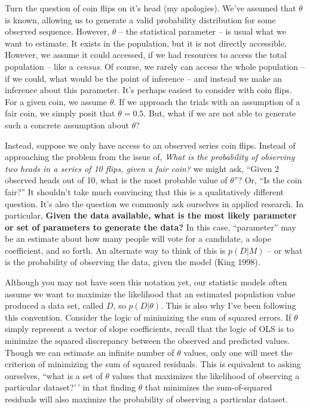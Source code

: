 \documentclass[
]{book}
\begin{document}
Turn the question of coin flips on it's head (my apologies). We've assumed that \(\theta\) is known, allowing us to generate a valid probability distribution for some observed sequence. However, \(\theta\) -- the statistical parameter -- is usual what we want to estimate. It exists in the population, but it is not directly accessible. However, we assume it could accessed, if we had resources to access the total population -- like a \emph{census}. Of course, we rarely can access the whole population -- if we could, what would be the point of inference -- and instead we make an inference about this parameter. It's perhaps easiest to consider with coin flips. For a given coin, we assume \(\theta\). If we approach the trials with an assumption of a fair coin, we simply posit that \(\theta=0.5\). But, what if we are not able to generate such a concrete assumption about \(\theta\)?

Instead, suppose we only have access to an observed series coin flips. Instead of approaching the problem from the issue of, \emph{What is the probability of observing two heads in a series of 10 flips, given a fair coin?} we might ask, ``Given 2 observed heads out of 10, what is the most probable value of \(\theta\)''? Or, ``Is the coin fair?'' It shouldn't take much convincing that this is a qualitatively different question. It's also the question we commonly ask ourselves in applied research. In particular, \textbf{Given the data available, what is the most likely parameter or set of parameters to generate the data?} In this case, ``parameter'' may be an estimate about how many people will vote for a candidate, a slope coefficient, and so forth. An alternate way to think of this is \(p(D|M)\) -- or what is the probability of observing the data, given the model (King 1998).

Although you may not have seen this notation yet, our statistic models often assume we want to maximize the likelihood that an estimated population value produced a data set, called \(D\), so \(p(D | \theta)\). This is also why I've been following this convention. Consider the logic of minimizing the sum of squared errors. If \(\theta\) simply represent a vector of slope coefficients, recall that the logic of OLS is to minimize the squared discrepancy between the observed and predicted values. Though we can estimate an infinite number of \(\theta\) values, only one will meet the criterion of minimizing the sum of squared residuals. This is equivalent to asking ourselves, ``what is a set of \(\theta\) values that maximizes the likelihood of observing a particular dataset?'\,' in that finding \(\theta\) that minimizes the sum-of-squared residuals will also maximize the probability of observing a particular dataset.
\end{document}
